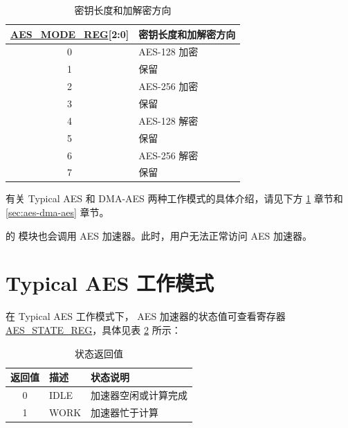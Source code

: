 \documentclass[main\_\_CN.tex]{subfiles}
\begin{document}
\begin{longtable}[c]{ | c | l | }
\caption{密钥长度和加解密方向}
\label{tab:aes-operation}
\\\hline
\rowcolor{lightgray}
\hyperref[regdesc:AESMODEREG]{AES\_MODE\_REG}[2:0]     & 密钥长度和加解密方向\\
    \hline
    0                   & AES-128 加密    \\
    \hline
    1                   & 保留    \\
    \hline
    2                   & AES-256 加密    \\
    \hline
    3                   & 保留    \\
    \hline
    4                   & AES-128 解密    \\
    \hline
    5                   & 保留    \\
    \hline
    6                   & AES-256 解密    \\
    \hline
    7                   & 保留    \\
    \hline
\end{longtable}

有关 Typical AES 和 DMA-AES 两种工作模式的具体介绍，请见下方 \ref{sec:aes-typical-modes} 章节和 \ref{sec:aes-dma-aes} 章节。

\begin{importantlisting}
\vspace{-0.5em}

    \chipname{} 的  模块也会调用 AES 加速器。此时，用户无法正常访问 AES 加速器。
\end{importantlisting}

\section{Typical AES 工作模式}\label{sec:aes-typical-modes}

在 Typical AES 工作模式下，
AES 加速器的状态值可查看寄存器 \hyperref[regdesc:AESSTATEREG]{AES\_STATE\_REG}，具体见表 \ref{tab:aes-state-value-typical} 所示：

\begin{longtable}[c]{ |c | l | l | }
\caption{状态返回值}
\label{tab:aes-state-value-typical}
\\\hline
\rowcolor{lightgray}
返回值 & 描述 &  状态说明 \\ \hline

    0                   & IDLE      &   加速器空闲或计算完成\\ \hline
    1                   & WORK      &   加速器忙于计算     \\ \hline
\end{longtable}
\end{document}
